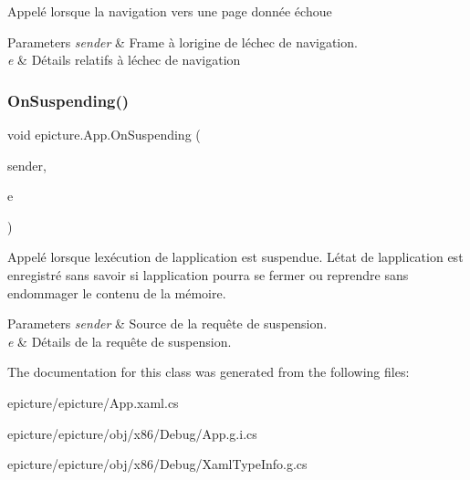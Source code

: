 Appelé lorsque la navigation vers une page donnée échoue 


\begin{DoxyParams}{Parameters}
{\em sender} & Frame à l\textquotesingle{}origine de l\textquotesingle{}échec de navigation.\\
\hline
{\em e} & Détails relatifs à l\textquotesingle{}échec de navigation\\
\hline
\end{DoxyParams}
\mbox{\label{classepicture_1_1_app_afc42747b09fad5af9daba6e0121ced9a}} 
\subsubsection{\texorpdfstring{On\+Suspending()}{OnSuspending()}}
{\footnotesize\ttfamily void epicture.\+App.\+On\+Suspending (\begin{DoxyParamCaption}\item[{object}]{sender,  }\item[{Suspending\+Event\+Args}]{e }\end{DoxyParamCaption})\hspace{0.3cm}{\ttfamily [private]}}



Appelé lorsque l\textquotesingle{}exécution de l\textquotesingle{}application est suspendue. L\textquotesingle{}état de l\textquotesingle{}application est enregistré sans savoir si l\textquotesingle{}application pourra se fermer ou reprendre sans endommager le contenu de la mémoire. 


\begin{DoxyParams}{Parameters}
{\em sender} & Source de la requête de suspension.\\
\hline
{\em e} & Détails de la requête de suspension.\\
\hline
\end{DoxyParams}


The documentation for this class was generated from the following files\+:\begin{DoxyCompactItemize}
\item 
epicture/epicture/App.\+xaml.\+cs\item 
epicture/epicture/obj/x86/\+Debug/App.\+g.\+i.\+cs\item 
epicture/epicture/obj/x86/\+Debug/Xaml\+Type\+Info.\+g.\+cs\end{DoxyCompactItemize}
